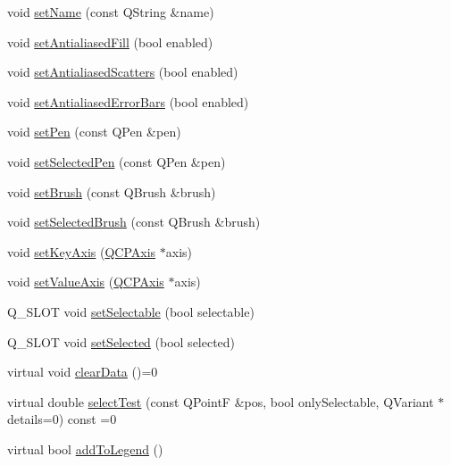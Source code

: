 \begin{DoxyCompactItemize}
\item 
void \hyperlink{class_q_c_p_abstract_plottable_ab79c7ba76bc7fa89a4b3580e12149f1f}{set\+Name} (const Q\+String \&name)
\item 
void \hyperlink{class_q_c_p_abstract_plottable_a089d6b5577120239b55c39ed27c39536}{set\+Antialiased\+Fill} (bool enabled)
\item 
void \hyperlink{class_q_c_p_abstract_plottable_a2f03f067ede2ed4da6f7d0e4777a3f02}{set\+Antialiased\+Scatters} (bool enabled)
\item 
void \hyperlink{class_q_c_p_abstract_plottable_a757beb744b96cf1855cca5ab9d3ecf52}{set\+Antialiased\+Error\+Bars} (bool enabled)
\item 
void \hyperlink{class_q_c_p_abstract_plottable_ab74b09ae4c0e7e13142fe4b5bf46cac7}{set\+Pen} (const Q\+Pen \&pen)
\item 
void \hyperlink{class_q_c_p_abstract_plottable_a6911603cad23ab0469b108224517516f}{set\+Selected\+Pen} (const Q\+Pen \&pen)
\item 
void \hyperlink{class_q_c_p_abstract_plottable_a7a4b92144dca6453a1f0f210e27edc74}{set\+Brush} (const Q\+Brush \&brush)
\item 
void \hyperlink{class_q_c_p_abstract_plottable_ae8c816874089f7a44001e8618e81a9dc}{set\+Selected\+Brush} (const Q\+Brush \&brush)
\item 
void \hyperlink{class_q_c_p_abstract_plottable_a8524fa2994c63c0913ebd9bb2ffa3920}{set\+Key\+Axis} (\hyperlink{class_q_c_p_axis}{Q\+C\+P\+Axis} $\ast$axis)
\item 
void \hyperlink{class_q_c_p_abstract_plottable_a71626a07367e241ec62ad2c34baf21cb}{set\+Value\+Axis} (\hyperlink{class_q_c_p_axis}{Q\+C\+P\+Axis} $\ast$axis)
\item 
Q\+\_\+\+S\+L\+OT void \hyperlink{class_q_c_p_abstract_plottable_a22c69299eb5569e0f6bf084877a37dc4}{set\+Selectable} (bool selectable)
\item 
Q\+\_\+\+S\+L\+OT void \hyperlink{class_q_c_p_abstract_plottable_afbd5428c2952f59d952e11ab5cd79176}{set\+Selected} (bool selected)
\item 
virtual void \hyperlink{class_q_c_p_abstract_plottable_a86e5b8fd4b6ff4f4084e7ea4c573fc53}{clear\+Data} ()=0
\item 
virtual double \hyperlink{class_q_c_p_abstract_plottable_a38efe9641d972992a3d44204bc80ec1d}{select\+Test} (const Q\+PointF \&pos, bool only\+Selectable, Q\+Variant $\ast$details=0) const =0
\item 
virtual bool \hyperlink{class_q_c_p_abstract_plottable_a70f8cabfd808f7d5204b9f18c45c13f5}{add\+To\+Legend} ()

\end{DoxyCompactItemize}
